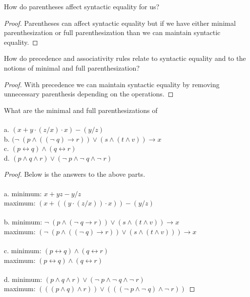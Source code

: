\documentclass[12pt]{article}
\newenvironment{exercise}[2][Exercise]{\begin{trivlist}
\item[\hskip \labelsep {\bfseries #1}\hskip \labelsep {\bfseries #2.}]}{\end{trivlist}}
\begin{document}
\begin{exercise}{10}
How do parentheses affect syntactic equality for us?
\end{exercise}

\begin{proof}
Parentheses can affect syntactic equality but if we have either minimal parenthesization or full parenthesization than we can maintain syntactic equality. 

\end{proof}

\begin{exercise}{11}
How do precedence and associativity rules relate to syntactic equality and to the notions of minimal and full parenthesization?
\end{exercise}

\begin{proof}
With precedence we can maintain syntactic equality by removing unnecessary parenthesis depending on the operations. 
\end{proof}

\begin{exercise}{12}
What are the minimal and full parenthesizations of \\ \\
a. $( x + y \cdot (z/x) \cdot x ) - (y/z)$ \\ 
b. $(\neg\; (p \land ((\neg\; q) \rightarrow r)) \lor (s \land (t \land v)) \rightarrow x$ \\ 
c. $(p \leftrightarrow q) \land (q \leftrightarrow r)$ \\ 
d. $(p \land q \land r) \lor (\neg\; p \land \neg\; q \land \neg\; r)$ \\ 
\end{exercise}

\begin{proof}
Below is the answers to the above parts. \\ \\
a. minimum: $x + yz - y/z$ \\ maximum: $(x +((y \cdot (z/x)) \cdot x)) - (y/z)$ \\ \\
b. minimum: $\neg\; (p \land (\neg\; q \rightarrow r)) \lor (s \land (t \land v)) \rightarrow x$ \\ maximum: $(\neg\; (p \land ((\neg\; q) \rightarrow r)) \lor (s \land (t \land v))) \rightarrow x$\\ \\
c. minimum: $(p \leftrightarrow q) \land (q \leftrightarrow r)$ \\ 
maximum: $(p \leftrightarrow q) \land (q \leftrightarrow r)$ \\ \\
d. minimum: $(p \land q \land r) \lor (\neg\; p \land \neg\; q \land \neg\; r)$ \\ 
maximum: $(((p \land q) \land r)) \lor (((\neg\; p \land \neg\; q) \land \neg\; r))$

\end{proof}
\end{document}
